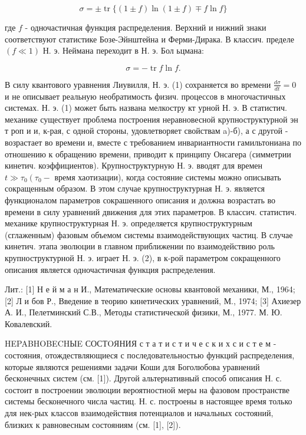 \documentclass[10pt]{article}
\begin{document}
\[

\sigma= \pm \operatorname{tr}\{(1 \pm f) \ln (1 \pm f) \mp f \ln f\}

\]



где $f$ - одночастичная функция распределения. Верхний и нижний знаки соответствуют статистике Бозе-Эйнштейна и Ферми-Дирака. В классич. пределе $(f \ll 1)$ Н. э. Неймана переходит в Н. э. Бол ьцмана:



\[

\sigma=-\operatorname{tr} f \ln f .

\]



В силу квантового уравнения Лиувилля, Н. э. (1) сохраняется во времени $\frac{d \sigma}{d t}=0$ и не описывает реальную необратимость физич. процессов в многочастичных системах. Н. э. (1) может быть названа мелкостру кт урной Н. э. В статистич. механике существует проблема построения неравновесной крупноструктурной эн т роп и и, к-рая, с одной стороны, удовлетворяет свойствам a)-б), а с другой - возрастает во времени и, вместе с требованием инвариантности гамильтониана по отношению к обращению времени, приводит к принципу Онсагера (симметрии кинетич. коэффициентов). Крупноструктурную Н. э. вводят для времен $t \gg \tau_{0}\left(\tau_{0}-\right.$ время хаотизации), когда состояние системы можно описывать сокращенным образом. В этом случае крупноструктурная Н. э. является функционалом параметров сокрашенного описания и должна возрастать во времени в силу уравнений движения для этих параметров. В классич. статистич. механике крупноструктурная Н. э. определяется крупноструктурным (сглаженным) фазовым объемом системы взаимодействующих частиц. В случае кинетич. этапа эволюции в главном приближении по взаимодействию роль крупноструктурной Н. э. играет Н. э. (2), в к-рой параметром сокращенного описания является одночастичная функция распределения.



Лит.: [1] Н е й м а н И., Математические основы квантовой механики, М., 1964; [2] Л и бов Р., Введение в теорию кинетических уравнений, М., 1974; [3] Ахиезер А. И., Пелетминский С.В., Методы статистической физики, М., 1977. М. Ю. Ковалевский.



HEPABHOBECHЫE СОСТOЯНИЯ с т а т и с т и ч е с к и х с и с т е м - состояния, отождествляющиеся с последовательностью функций распределения, которые являются решениями задачи Коши для Боголюбова уравнений бесконечных систем (см. [1]). Другой альтернативный способ описания Н. с. состоит в построении эволюции вероятностной меры на фазовом пространстве системы бесконечного числа частиц. Н. с. построены в настоящее время только для нек-рых классов взаимодействия потенциалов и начальных состояний, близких к равновесным состояниям (см. [1], [2]).
\end{document}
